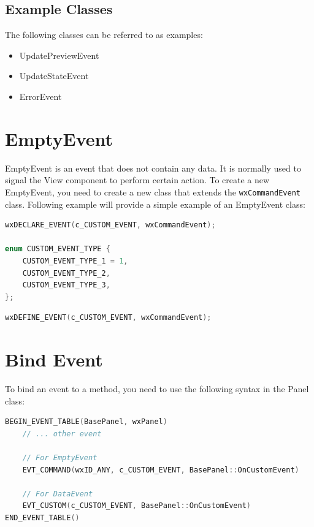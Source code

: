 \subsection{Example Classes}
The following classes can be referred to as examples:
\begin{itemize}
      \item UpdatePreviewEvent
      \item UpdateStateEvent
      \item ErrorEvent
\end{itemize}

\section{EmptyEvent}

EmptyEvent is an event that does not contain any data. It is normally used to signal the View component to perform certain action. To create a new EmptyEvent, you need to create a new class that extends the \texttt{wxCommandEvent} class. Following example will provide a simple example of an EmptyEvent class:

\begin{lstlisting}[language=C++, caption={EmptyEvent class example}]
wxDECLARE_EVENT(c_CUSTOM_EVENT, wxCommandEvent);

enum CUSTOM_EVENT_TYPE {
    CUSTOM_EVENT_TYPE_1 = 1,
    CUSTOM_EVENT_TYPE_2,
    CUSTOM_EVENT_TYPE_3,
};
\end{lstlisting}

\begin{lstlisting}[language=C++, caption={EmptyEvent continued}]
wxDEFINE_EVENT(c_CUSTOM_EVENT, wxCommandEvent);
\end{lstlisting}

\section{Bind Event}

To bind an event to a method, you need to use the following syntax in the Panel class:

\begin{lstlisting}[language=C++, caption={Binding Event in Panel class}]
BEGIN_EVENT_TABLE(BasePanel, wxPanel)
    // ... other event

    // For EmptyEvent
    EVT_COMMAND(wxID_ANY, c_CUSTOM_EVENT, BasePanel::OnCustomEvent)

    // For DataEvent
    EVT_CUSTOM(c_CUSTOM_EVENT, BasePanel::OnCustomEvent)
END_EVENT_TABLE()
\end{lstlisting}

